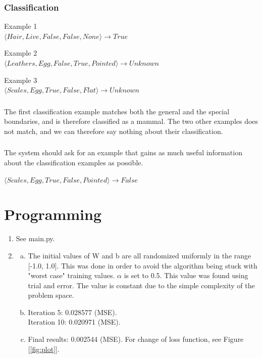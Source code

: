 \documentclass{article}
\begin{document}
\subsubsection*{Classification}
Example 1 \\
$\langle Hair, Live, False, False, None \rangle \rightarrow True$

Example 2 \\
$\langle Leathers, Egg, False, True, Pointed \rangle \rightarrow Unknown$

Example 3 \\
$\langle Scales, Egg, True, False, Flat \rangle \rightarrow Unknown$

\subsubsection{}
The first classification example matches both the general and the special boundaries, and is therefore classified as a mammal. The two other examples does not match, and we can therefore say nothing about their classification.

\subsubsection{}
The system should ask for an example that gains as much useful information about the classification examples as possible.

$\langle Scales, Egg, True, False, Pointed \rangle \rightarrow False$

\section{Programming}

\begin{enumerate}
    \item See main.py.
    \item 
        \begin{enumerate}[a)]
            \item The initial values of W and b are all randomized uniformly in the range [-1.0, 1.0]. This was done in order to avoid the algorithm being stuck with "worst case" training values. $\alpha$ is set to 0.5. This value was found using trial and error. The value is constant due to the simple complexity of the problem space.
            \item Iteration 5: 0.028577 (MSE). \\
                  Iteration 10: 0.020971 (MSE).
            \item Final results: 0.002544 (MSE). For change of loss function, see Figure [\ref{fig:plot}].
        \end{enumerate}
\end{enumerate}
\end{document}
